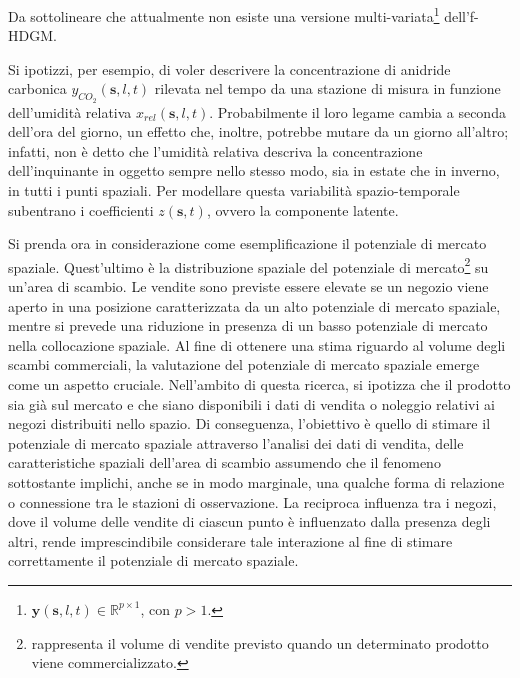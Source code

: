 
Da sottolineare che attualmente non esiste una versione multi-variata\footnote{$\mathbf{y}(\mathbf{s}, l, t)\in\mathbb{R}^{p\times 1}$, con $p>1$.} dell'f-HDGM.
\par Si ipotizzi, per esempio, di voler descrivere la concentrazione di anidride carbonica $y_{CO_2}(\mathbf{s}, l, t)$ rilevata nel tempo da una stazione di misura in funzione dell'umidità relativa $x_{rel}(\mathbf{s}, l, t)$. Probabilmente il loro legame cambia a seconda dell'ora del giorno, un effetto che, inoltre, potrebbe mutare da un giorno all'altro; infatti, non è detto che l'umidità relativa descriva la concentrazione dell'inquinante in oggetto sempre nello stesso modo, sia in estate che in inverno, in tutti i punti spaziali. Per modellare questa variabilità spazio-temporale subentrano i coefficienti $z(\mathbf{s}, t)$, ovvero la componente latente.
\par Si prenda ora in considerazione come esemplificazione il potenziale di mercato spaziale. Quest'ultimo è la distribuzione spaziale del potenziale di mercato\footnote{rappresenta il volume di vendite previsto quando un determinato prodotto viene commercializzato.} su un'area di scambio.
Le vendite sono previste essere elevate se un negozio viene aperto in una posizione caratterizzata da un alto potenziale di mercato spaziale, mentre si prevede una riduzione in presenza di un basso potenziale di mercato nella collocazione spaziale.
Al fine di ottenere una stima riguardo al volume degli scambi commerciali, la valutazione del potenziale di mercato spaziale emerge come un aspetto cruciale. Nell'ambito di questa ricerca, si ipotizza che il prodotto sia già sul mercato e che siano disponibili i dati di vendita o noleggio relativi ai negozi distribuiti nello spazio. Di conseguenza, l'obiettivo è quello di stimare il potenziale di mercato spaziale attraverso l'analisi dei dati di vendita, delle caratteristiche spaziali dell'area di scambio assumendo che il fenomeno sottostante implichi, anche se in modo marginale, una qualche forma di relazione o connessione tra le stazioni di osservazione. La reciproca influenza tra i negozi, dove il volume delle vendite di ciascun punto è influenzato dalla presenza degli altri, rende imprescindibile considerare tale interazione al fine di stimare correttamente il potenziale di mercato spaziale.
